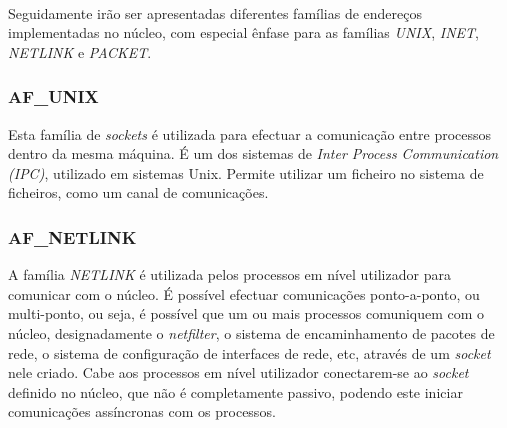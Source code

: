 \paragraph*{}
Seguidamente irão ser apresentadas diferentes famílias de endereços implementadas no núcleo, com especial ênfase para as famílias \textit{UNIX}, \textit{INET}, \textit{NETLINK} e \textit{PACKET}.





\subsubsection{AF\_UNIX}

Esta família de \textit{sockets} é utilizada para efectuar a comunicação entre processos dentro da mesma máquina.
É um dos sistemas de \textit{Inter Process Communication (IPC)}, utilizado em sistemas Unix.
\color{red}Permite utilizar um ficheiro no sistema de ficheiros, como um canal de comunicações.\color{black}

\subsubsection{AF\_NETLINK}

A família \textit{NETLINK} é utilizada pelos processos em nível utilizador para comunicar com o núcleo.
É possível efectuar comunicações ponto-a-ponto, ou multi-ponto, ou seja, é possível que um ou mais processos comuniquem com o núcleo, designadamente o \textit{netfilter}, o sistema de encaminhamento de pacotes de rede, o sistema de configuração de interfaces de rede, etc, através de um \textit{socket} nele criado.
Cabe aos processos em nível utilizador conectarem-se ao \textit{socket} definido no núcleo, que não é completamente passivo, podendo este iniciar comunicações assíncronas com os processos.

